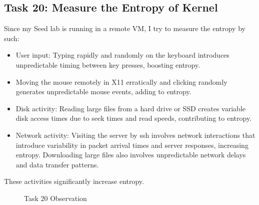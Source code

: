 \documentclass[a4paper,11pt]{article}
\begin{document}
\subsection{Task 20: Measure the Entropy of Kernel}
Since my Seed lab is running in a remote VM, I try to measure the entropy by such:
\begin{itemize}
    \item User input:
    Typing rapidly and randomly on the keyboard introduces unpredictable timing between key presses, boosting entropy.
    \item Moving the mouse remotely in X11 erratically and clicking randomly generates unpredictable mouse events, adding to entropy.
    \item Disk activity:
    Reading large files from a hard drive or SSD creates variable disk access times due to seek times and read speeds, contributing to entropy.
    \item Network activity:
    Visiting the server by ssh involves network interactions that introduce variability in packet arrival times and server responses, increasing entropy.
    Downloading large files also involves unpredictable network delays and data transfer patterns.
\end{itemize}
These activities significantly increase entropy.
\begin{figure}[h]
    \centering
    \hfill
    \hfill
    \caption{Task 20 Observation}\label{fig:task20}
\end{figure}
\end{document}
